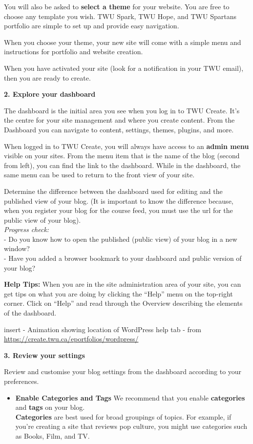 \documentclass[
]{book}
\providecommand{\tightlist}{%
  \setlength{\itemsep}{0pt}\setlength{\parskip}{0pt}}
\theoremstyle{definition}
\theoremstyle{definition}
\theoremstyle{definition}
\theoremstyle{definition}
\theoremstyle{remark}
\begin{document}
\begin{reflect}
You will also be asked to \textbf{select a theme} for your website. You are free to choose any template you wish. TWU Spark, TWU Hope, and TWU Spartans portfolio are simple to set up and provide easy navigation.

When you choose your theme, your new site will come with a simple menu and instructions for portfolio and website creation.

When you have activated your site (look for a notification in your TWU email), then you are ready to create.

\textbf{2. Explore your dashboard}

The dashboard is the initial area you see when you log in to TWU Create. It's the centre for your site management and where you create content. From the Dashboard you can navigate to content, settings, themes, plugins, and more.

When logged in to TWU Create, you will always have access to an \textbf{admin menu} visible on your sites. From the menu item that is the name of the blog (second from left), you can find the link to the dashboard. While in the dashboard, the same menu can be used to return to the front view of your site.

Determine the difference between the dashboard used for editing and the published view of your blog. (It is important to know the difference because, when you register your blog for the course feed, you must use the url for the public view of your blog).\\
\emph{Progress check:}\\
- Do you know how to open the published (public view) of your blog in a new window?\\
- Have you added a browser bookmark to your dashboard and public version of your blog?

\textbf{Help Tips:} When you are in the site administration area of your site, you can get tips on what you are doing by clicking the ``Help'' menu on the top-right corner. Click on ``Help'' and read through the Overview describing the elements of the dashboard.

insert - Animation showing location of WordPress help tab - from \url{https://create.twu.ca/eportfolios/wordpress/}

\textbf{3. Review your settings}

Review and customise your blog settings from the dashboard according to your preferences.

\begin{itemize}
\tightlist
\item
  \textbf{Enable Categories and Tags}
  We recommend that you enable \textbf{categories} and \textbf{tags} on your blog.\\
  \textbf{Categories} are best used for broad groupings of topics. For example, if you're creating a site that reviews pop culture, you might use categories such as Books, Film, and TV.
\end{itemize}


\end{reflect}
\end{document}
